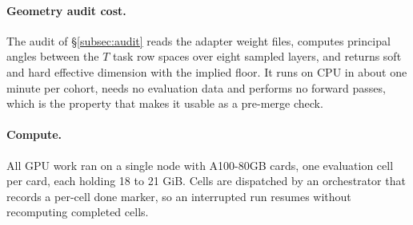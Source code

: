 \paragraph{Geometry audit cost.} The audit of \S\ref{subsec:audit} reads
the adapter weight files, computes principal angles between the $T$ task
row spaces over eight sampled layers, and returns soft and hard effective
dimension with the implied floor. It runs on CPU in about one minute per
cohort, needs no evaluation data and performs no forward passes, which is
the property that makes it usable as a pre-merge check.

\paragraph{Compute.} All GPU work ran on a single node with A100-80GB
cards, one evaluation cell per card, each holding 18 to 21 GiB. Cells are
dispatched by an orchestrator that records a per-cell done marker, so an
interrupted run resumes without recomputing completed cells.
